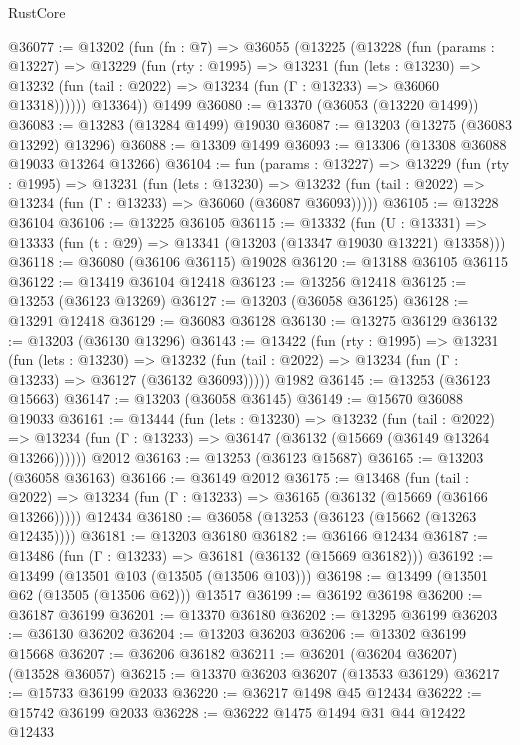 \begin{lexlean}{RustCore}
\begin{coremodule}
@36077 := @13202
    (fun (fn : @7) =>
    @36055
      (@13225
        (@13228
          (fun (params : @13227) =>
          @13229
            (fun (rty : @1995) =>
            @13231
              (fun (lets : @13230) =>
              @13232 (fun (tail : @2022) => @13234 (fun (Γ : @13233) => @36060 @13318))))))
        @13364))
    @1499
@36080 := @13370 (@36053 (@13220 @1499))
@36083 := @13283 (@13284 @1499) @19030
@36087 := @13203 (@13275 (@36083 @13292) @13296)
@36088 := @13309 @1499
@36093 := @13306 (@13308 @36088 @19033 @13264 @13266)
@36104 := fun (params : @13227) =>
  @13229
    (fun (rty : @1995) =>
    @13231
      (fun (lets : @13230) =>
      @13232 (fun (tail : @2022) => @13234 (fun (Γ : @13233) => @36060 (@36087 @36093)))))
@36105 := @13228 @36104
@36106 := @13225 @36105
@36115 := @13332
    (fun (U : @13331) => @13333 (fun (t : @29) => @13341 (@13203 (@13347 @19030 @13221) @13358)))
@36118 := @36080 (@36106 @36115) @19028
@36120 := @13188 @36105 @36115
@36122 := @13419 @36104 @12418
@36123 := @13256 @12418
@36125 := @13253 (@36123 @13269)
@36127 := @13203 (@36058 @36125)
@36128 := @13291 @12418
@36129 := @36083 @36128
@36130 := @13275 @36129
@36132 := @13203 (@36130 @13296)
@36143 := @13422
    (fun (rty : @1995) =>
    @13231
      (fun (lets : @13230) =>
      @13232 (fun (tail : @2022) => @13234 (fun (Γ : @13233) => @36127 (@36132 @36093)))))
    @1982
@36145 := @13253 (@36123 @15663)
@36147 := @13203 (@36058 @36145)
@36149 := @15670 @36088 @19033
@36161 := @13444
    (fun (lets : @13230) =>
    @13232
      (fun (tail : @2022) =>
      @13234 (fun (Γ : @13233) => @36147 (@36132 (@15669 (@36149 @13264 @13266))))))
    @2012
@36163 := @13253 (@36123 @15687)
@36165 := @13203 (@36058 @36163)
@36166 := @36149 @2012
@36175 := @13468
    (fun (tail : @2022) => @13234 (fun (Γ : @13233) => @36165 (@36132 (@15669 (@36166 @13266)))))
    @12434
@36180 := @36058 (@13253 (@36123 (@15662 (@13263 @12435))))
@36181 := @13203 @36180
@36182 := @36166 @12434
@36187 := @13486 (fun (Γ : @13233) => @36181 (@36132 (@15669 @36182)))
@36192 := @13499 (@13501 @103 (@13505 (@13506 @103)))
@36198 := @13499 (@13501 @62 (@13505 (@13506 @62))) @13517
@36199 := @36192 @36198
@36200 := @36187 @36199
@36201 := @13370 @36180
@36202 := @13295 @36199
@36203 := @36130 @36202
@36204 := @13203 @36203
@36206 := @13302 @36199 @15668
@36207 := @36206 @36182
@36211 := @36201 (@36204 @36207) (@13528 @36057)
@36215 := @13370 @36203 @36207 (@13533 @36129)
@36217 := @15733 @36199 @2033
@36220 := @36217 @1498 @45 @12434
@36222 := @15742 @36199 @2033
@36228 := @36222 @1475 @1494 @31 @44 @12422 @12433

\end{coremodule}
\end{lexlean}
